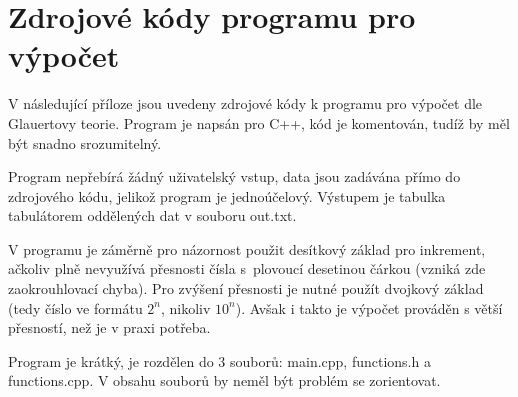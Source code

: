 \chapter{Zdrojové kódy programu pro výpočet}
V následující příloze jsou uvedeny zdrojové kódy k programu pro výpočet dle Glauertovy teorie. Program je napsán pro C++, kód je komentován, tudíž by měl být snadno srozumitelný.

Program nepřebírá žádný uživatelský vstup, data jsou zadávána přímo do zdrojového kódu, jelikož program je jednoúčelový. Výstupem je tabulka tabulátorem oddělených dat v souboru out.txt.

V programu je záměrně pro názornost použit desítkový základ pro inkrement, ačkoliv plně nevyužívá přesnosti čísla s~plovoucí desetinou čárkou (vzniká zde zaokrouhlovací chyba). Pro zvýšení přesnosti je nutné použít dvojkový základ (tedy číslo ve formátu $2^n$, nikoliv $10^n$). Avšak i takto je výpočet prováděn s větší přesností, než je v praxi potřeba.

Program je krátký, je rozdělen do 3 souborů: main.cpp, functions.h a functions.cpp. V obsahu souborů by neměl být problém se zorientovat.

